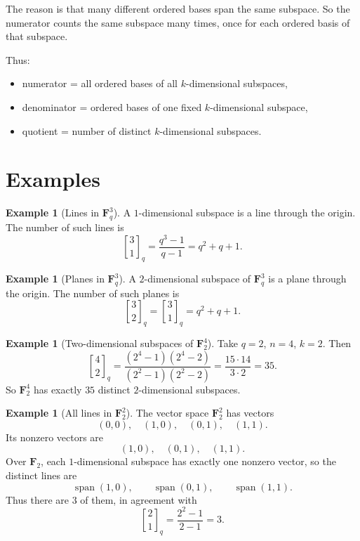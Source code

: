 \documentclass[11pt]{article}
\theoremstyle{definition}
\newtheorem{example}[theorem]{Example}
\theoremstyle{remark}
\newcommand{\F}{\mathbf{F}}
\newcommand{\Span}{\operatorname{span}}
\newcommand{\qbinom}[2]{\genfrac{[}{]}{0pt}{}{#1}{#2}_q}
\begin{document}
	The reason is that many different ordered bases span the same subspace. So the numerator counts the same subspace many times, once for each ordered basis of that subspace.
	
	Thus:
	\begin{itemize}
		\item numerator = all ordered bases of all \(k\)-dimensional subspaces,
		\item denominator = ordered bases of one fixed \(k\)-dimensional subspace,
		\item quotient = number of distinct \(k\)-dimensional subspaces.
	\end{itemize}
	
	\section{Examples}
	
	\begin{example}[Lines in \(\F_q^3\)]
		A \(1\)-dimensional subspace is a line through the origin. The number of such lines is
		\[
		\qbinom{3}{1}
		=
		\frac{q^3-1}{q-1}
		=
		q^2+q+1.
		\]
	\end{example}
	
	\begin{example}[Planes in \(\F_q^3\)]
		A \(2\)-dimensional subspace of \(\F_q^3\) is a plane through the origin. The number of such planes is
		\[
		\qbinom{3}{2}
		=
		\qbinom{3}{1}
		=
		q^2+q+1.
		\]
	\end{example}
	
	\begin{example}[Two-dimensional subspaces of \(\F_2^4\)]
		Take \(q=2\), \(n=4\), \(k=2\). Then
		\[
		\qbinom{4}{2}
		=
		\frac{(2^4-1)(2^4-2)}{(2^2-1)(2^2-2)}
		=
		\frac{15\cdot 14}{3\cdot 2}
		=
		35.
		\]
		So \(\F_2^4\) has exactly \(35\) distinct \(2\)-dimensional subspaces.
	\end{example}
	
	\begin{example}[All lines in \(\F_2^2\)]
		The vector space \(\F_2^2\) has vectors
		\[
		(0,0),\quad (1,0),\quad (0,1),\quad (1,1).
		\]
		Its nonzero vectors are
		\[
		(1,0),\quad (0,1),\quad (1,1).
		\]
		Over \(\F_2\), each \(1\)-dimensional subspace has exactly one nonzero vector, so the distinct lines are
		\[
		\Span(1,0),\qquad \Span(0,1),\qquad \Span(1,1).
		\]
		Thus there are \(3\) of them, in agreement with
		\[
		\qbinom{2}{1}=\frac{2^2-1}{2-1}=3.
		\]
	\end{example}
	
\end{document}
